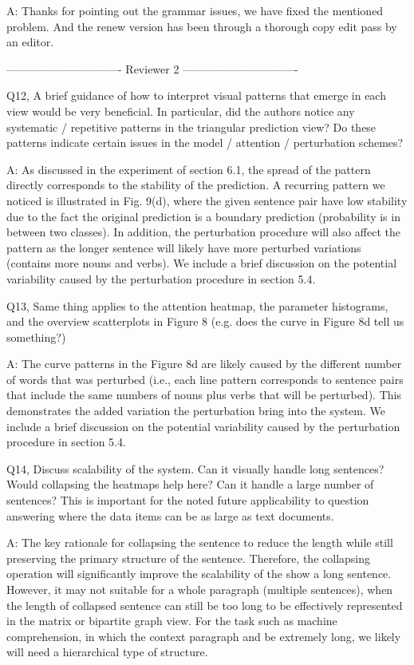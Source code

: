 A: Thanks for pointing out the grammar issues, we have fixed the mentioned problem. And the renew version has been through a thorough copy edit pass by an editor.

------------------------------- Reviewer 2 -------------------------------

Q12, A brief guidance of how to interpret visual patterns that emerge in each view would be very beneficial. In particular, did the authors notice any systematic / repetitive patterns in the triangular prediction view? Do these patterns indicate certain issues in the model / attention / perturbation schemes?

A: As discussed in the experiment of section 6.1, the spread of the pattern directly corresponds to the stability of the prediction. A recurring pattern we noticed is illustrated in Fig. 9(d), where the given sentence pair have low stability due to the fact the original prediction is a boundary prediction (probability is in between two classes). In addition, the perturbation procedure will also affect the pattern as the longer sentence will likely have more perturbed variations (contains more nouns and verbs). We include a brief discussion on the potential variability caused by the perturbation procedure in section 5.4.

Q13, Same thing applies to the attention heatmap, the parameter histograms, and the overview scatterplots in Figure 8 (e.g. does the curve in Figure 8d tell us something?)

A: The curve patterns in the Figure 8d are likely caused by the different number of words that was perturbed (i.e., each line pattern corresponds to sentence pairs that include the same numbers of nouns plus verbs that will be perturbed). This demonstrates the added variation the perturbation bring into the system. We include a brief discussion on the potential variability caused by the perturbation procedure in section 5.4.

Q14, Discuss scalability of the system. Can it visually handle long sentences? Would collapsing the heatmaps help here? Can it handle a large number of sentences? This is important for the noted future applicability to question answering where the data items can be as large as text documents.

A: The key rationale for collapsing the sentence to reduce the length while still preserving the primary structure of the sentence. Therefore, the collapsing operation will significantly improve the scalability of the show a long sentence. However, it may not suitable for a whole paragraph (multiple sentences), when the length of collapsed sentence can still be too long to be effectively represented in the matrix or bipartite graph view. For the task such as machine comprehension, in which the context paragraph and be extremely long, we likely will need a hierarchical type of structure.

